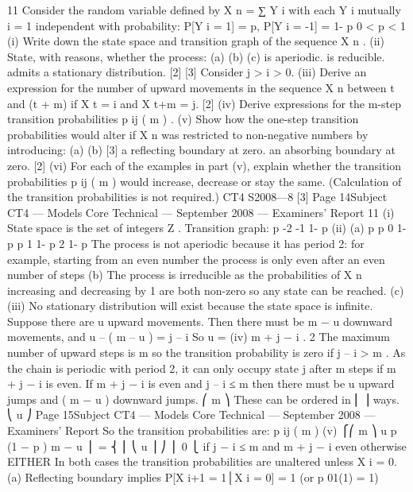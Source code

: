 \documentclass[a4paper,12pt]{article}
\begin{document}
\begin{enumerate}


11
Consider the random variable defined by X n =
∑ Y i with each Y i mutually
i = 1
independent with probability:
P[Y i = 1] = p, P[Y i = -1] = 1- p
0 < p < 1
(i) Write down the state space and transition graph of the sequence X n .
(ii) State, with reasons, whether the process:
(a)
(b)
(c)
is aperiodic.
is reducible.
admits a stationary distribution.
[2]
[3]
Consider j > i > 0.
(iii) Derive an expression for the number of upward movements in the sequence X n
between t and (t + m) if X t = i and X t+m = j.
[2]
(iv) Derive expressions for the m-step transition probabilities p ij ( m ) .
(v) Show how the one-step transition probabilities would alter if X n was restricted
to non-negative numbers by introducing:
(a)
(b)
[3]
a reflecting boundary at zero.
an absorbing boundary at zero.
[2]
(vi)
For each of the examples in part (v), explain whether the transition
probabilities p ij ( m ) would increase, decrease or stay the same.
(Calculation of the transition probabilities is not required.)
CT4 S2008—8
[3]
Page 14Subject CT4 — Models Core Technical — September 2008 — Examiners’ Report
11
(i)
State space is the set of integers Ζ .
Transition graph:
p
-2
-1
1- p
(ii)
(a)
p
p
0
1- p
p
1
1- p
2
1- p
The process is not aperiodic
because it has period 2:
for example, starting from an even number the
process is only even after an even number of steps
(b)
The process is irreducible
as the probabilities of X n increasing and decreasing by 1 are both
non-zero so any state can be reached.
(c)
(iii)
No stationary distribution will exist because the state space is infinite.
Suppose there are u upward movements.
Then there must be m − u downward movements,
and u – ( m – u ) = j – i
So u =
(iv)
m + j − i
.
2
The maximum number of upward steps is m so the
transition probability is zero if j – i > m .
As the chain is periodic with period 2, it can only occupy
state j after m steps if m + j − i is even.
If m + j − i is even and j – i ≤ m then there must be u
upward jumps and ( m − u ) downward jumps.
⎛ m ⎞
These can be ordered in ⎜ ⎟ ways.
⎝ u ⎠
Page 15Subject CT4 — Models Core Technical — September 2008 — Examiners’ Report
So the transition probabilities are:
p ij ( m )
(v)
⎧⎛ m ⎞ u
p (1 − p ) m − u
⎪
= ⎨ ⎜ ⎝ u ⎟ ⎠
⎪
0
⎩
if j − i ≤ m and m + j − i even
otherwise
EITHER
In both cases the transition probabilities
are unaltered unless X i = 0.
(a) Reflecting boundary implies
P[X i+1 = 1│X i = 0] = 1 (or p 01(1) = 1)

\end{enumerate}
\end{document}
